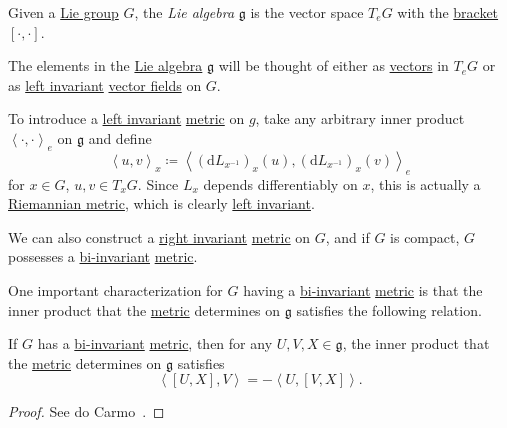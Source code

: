 \begin{definition}\label{def:Lie-algebra}
	Given a \hyperref[def:Lie-group]{Lie group} \(G\), the \emph{Lie algebra} \(\mathfrak{g}\) is the vector space \(T_e G\) with the \hyperref[def:bracket]{bracket} \([\cdot, \cdot]\).
\end{definition}

\begin{note}
	The elements in the \hyperref[def:Lie-algebra]{Lie algebra} \(\mathfrak{g}\) will be thought of either as \hyperref[def:tangent-vector]{vectors} in \(T_e G\) or as \hyperref[def:vector-field-left-invariant]{left invariant} \hyperref[def:vector-field]{vector fields} on \(G\).
\end{note}

To introduce a \hyperref[def:Riemannian-metric-left-invariant]{left invariant} \hyperref[def:Riemannian-metric]{metric} on \(g\), take any arbitrary inner product \(\left\langle \cdot, \cdot \right\rangle _e\) on \(\mathfrak{g} \) and define
\begin{equation}\label{eq:inner-product-on-Lie-algebra}
	\left\langle u, v \right\rangle _x \coloneqq \left\langle (\mathrm{d} L_{x ^{-1} })_x(u), (\mathrm{d} L_{x ^{-1} })_x(v) \right\rangle _e
\end{equation}
for \(x\in G\), \(u, v\in T_x G\). Since \(L_x\) depends differentiably on \(x\), this is actually a \hyperref[def:Riemannian-metric]{Riemannian metric}, which is clearly \hyperref[def:Riemannian-metric-left-invariant]{left invariant}.

\begin{remark}
	We can also construct a \hyperref[def:Riemannian-metric-right-invariant]{right invariant} \hyperref[def:Riemannian-metric]{metric} on \(G\), and if \(G\) is compact, \(G\) possesses a \hyperref[def:Riemannian-metric-left-invariant]{bi-invariant} \hyperref[def:Riemannian-metric]{metric}.
\end{remark}

One important characterization for \(G\) having a \hyperref[def:Riemannian-metric-left-invariant]{bi-invariant} \hyperref[def:Riemannian-metric]{metric} is that the inner product that the \hyperref[def:Riemannian-metric]{metric} determines on \(\mathfrak{g} \) satisfies the following relation.

\begin{proposition}
	If \(G\) has a \hyperref[def:Riemannian-metric-left-invariant]{bi-invariant} \hyperref[def:Riemannian-metric]{metric}, then for any \(U, V, X\in \mathfrak{g} \), the inner product that the \hyperref[def:Riemannian-metric]{metric} determines on \(\mathfrak{g} \) satisfies
	\[
		\left\langle [U, X], V \right\rangle = -\left\langle U, [V, X] \right\rangle.
	\]
\end{proposition}
\begin{proof}
	See do Carmo~\cite[Page 40, 41]{flaherty2013riemannian}.
\end{proof}

